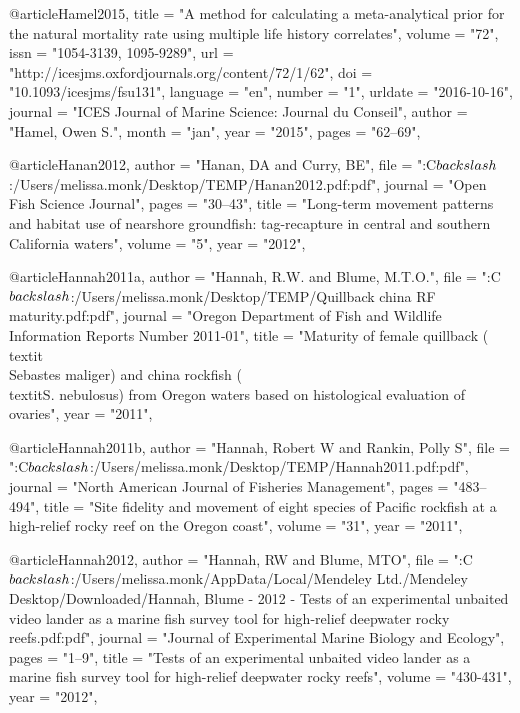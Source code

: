 @article{Hamel2015,
    title = "{A method for calculating a meta-analytical prior for the natural mortality rate using multiple life history correlates}",
    volume = "{72}",
    issn = "{1054-3139, 1095-9289}",
    url = "{http://icesjms.oxfordjournals.org/content/72/1/62}",
    doi = "{10.1093/icesjms/fsu131}",
    language = "{en}",
    number = "{1}",
    urldate = "{2016-10-16}",
    journal = "{ICES Journal of Marine Science: Journal du Conseil}",
    author = "{Hamel, Owen S.}",
    month = "jan",
    year = "{2015}",
    pages = "{62--69}",
}

@article{Hanan2012,
    author = "{Hanan, DA and Curry, BE}",
    file = "{:C$\\backslash$:/Users/melissa.monk/Desktop/TEMP/Hanan2012.pdf:pdf}",
    journal = "{Open Fish Science Journal}",
    pages = "{30--43}",
    title = "{{Long-term movement patterns and habitat use of nearshore groundfish: tag-recapture in central and southern California waters}}",
    volume = "{5}",
    year = "{2012}",
}

@article{Hannah2011a,
    author = "{Hannah, R.W. and Blume, M.T.O.}",
    file = "{:C$\\backslash$:/Users/melissa.monk/Desktop/TEMP/Quillback china RF maturity.pdf:pdf}",
    journal = "{Oregon Department of Fish and Wildlife Information Reports Number 2011-01}",
    title = "{{Maturity of female quillback (\\textit\\{{Sebastes} maliger}) and china rockfish (\\textit{S. nebulosus}) from Oregon waters based on histological evaluation of ovaries}}",
    year = "{2011}",
}

@article{Hannah2011b,
    author = "{Hannah, Robert W and Rankin, Polly S}",
    file = "{:C$\\backslash$:/Users/melissa.monk/Desktop/TEMP/Hannah2011.pdf:pdf}",
    journal = "{North American Journal of Fisheries Management}",
    pages = "{483--494}",
    title = "{{Site fidelity and movement of eight species of Pacific rockfish at a high-relief rocky reef on the Oregon coast}}",
    volume = "{31}",
    year = "{2011}",
}

@article{Hannah2012,
    author = "{Hannah, RW and Blume, MTO}",
    file = "{:C$\\backslash$:/Users/melissa.monk/AppData/Local/Mendeley Ltd./Mendeley Desktop/Downloaded/Hannah, Blume - 2012 - Tests of an experimental unbaited video lander as a marine fish survey tool for high-relief deepwater rocky reefs.pdf:pdf}",
    journal = "{Journal of Experimental Marine Biology and Ecology}",
    pages = "{1--9}",
    title = "{{Tests of an experimental unbaited video lander as a marine fish survey tool for high-relief deepwater rocky reefs}}",
    volume = "{430-431}",
    year = "{2012}",
}

